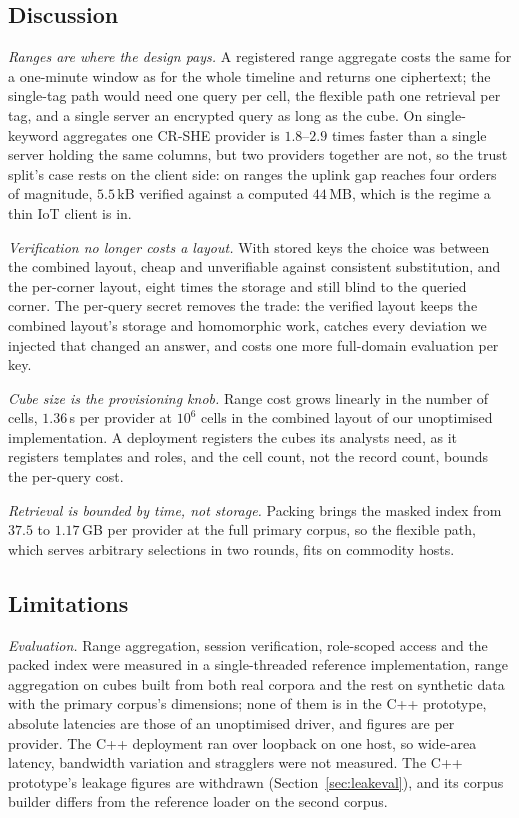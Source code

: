 \documentclass[a4paper,fleqn]{cas-sc}
\newif\ifauthorchecks
\newcommand{\authorcheck}[1]{\ifauthorchecks{\color{red}\textsf{[Authors: #1]}}\fi}
\begin{document}
\subsection{Discussion}
\emph{Ranges are where the design pays.} A registered range aggregate costs the
same for a one-minute window as for the whole timeline and returns one
ciphertext; the single-tag path would need one query per cell, the flexible
path one retrieval per tag, and a single server an encrypted query as long as
the cube. On single-keyword aggregates one CR-SHE provider is $1.8$--$2.9$
times faster than a single server holding the same columns, but two providers
together are not, so the trust split's case rests on the client side: on
ranges the uplink gap reaches four orders of magnitude, $5.5$\,kB verified
against a computed $44$\,MB, which is the regime a thin IoT client is in.

\emph{Verification no longer costs a layout.} With stored keys the choice was
between the combined layout, cheap and unverifiable against consistent
substitution, and the per-corner layout, eight times the storage and still
blind to the queried corner. The per-query secret removes the trade: the
verified layout keeps the combined layout's storage and homomorphic work,
catches every deviation we injected that changed an answer, and costs one more
full-domain evaluation per key.

\emph{Cube size is the provisioning knob.} Range cost grows linearly in the
number of cells, $1.36$\,s per provider at $10^6$ cells in the combined layout
of our unoptimised implementation. A deployment registers the cubes its
analysts need, as it registers templates and roles, and the cell count, not the
record count, bounds the per-query cost.

\emph{Retrieval is bounded by time, not storage.} Packing brings the masked
index from $37.5$ to $1.17$\,GB per provider at the full primary corpus, so the
flexible path, which serves arbitrary selections in two rounds, fits on
commodity hosts.

\subsection{Limitations}
\label{sec:limits}
\emph{Evaluation.} Range aggregation, session verification, role-scoped access
and the packed index were measured in a single-threaded reference
implementation, range aggregation on cubes built from both real corpora and
the rest on synthetic data with the primary corpus's dimensions; none of them
is in the C++ prototype, absolute latencies are those of an unoptimised
driver, and figures are per provider. The C++ deployment ran over loopback on
one host, so wide-area latency, bandwidth variation and stragglers were not
measured. The C++ prototype's leakage figures are withdrawn
(Section~\ref{sec:leakeval}), and its corpus builder differs from the
reference loader on the second corpus.
\authorcheck{Port range aggregation and the session check to the C++ build and
deploy providers in at least two cloud regions.}
\end{document}
